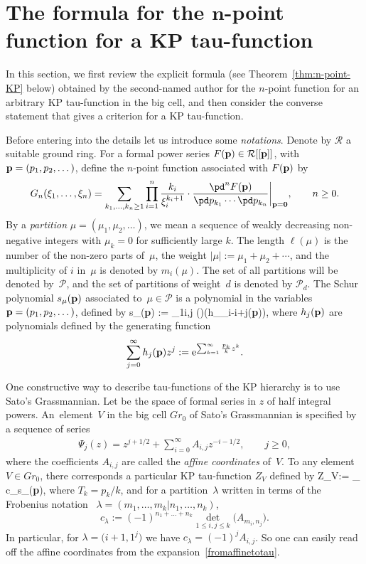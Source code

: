 \section[The formula for the n-point function for a KP tau-function]{The formula for the $\boldsymbol{n}$-point function for a KP tau-function}\label{sectionKP}

In this section, we first review the explicit formula (see Theorem~\ref{thm:n-point-KP} below) obtained by the second-named author
for the $n$-point function for an arbitrary KP tau-function in the big cell, and then consider the converse statement that
gives a criterion for a KP tau-function.

Before entering into the details let us introduce some {\it notations}.
Denote by $\mathcal{R}$ a suitable ground ring.
For a formal power series $F({\bf p})\in \mathcal{R}[[{\bf p}]]$,
with ${\bf p}=(p_1,p_2,\dots)$, define the $n$-point function associated with $F({\bf p})$ by
\[
G_n(\xi_1, \dots, \xi_n) = \sum_{k_1,\dots,k_n\ge1} \prod_{i=1}^n \frac{k_i}{\xi_i^{k_i+1}} \cdot
\frac{\pd^n F({\bf p})}{\pd p_{k_1} \cdots \pd p_{k_n}}\biggr|_{{\bf p} = {\bf 0}}, \qquad n\ge0.
\]
By a {\it partition} $\mu=(\mu_1,\mu_2,\dots)$, we mean a sequence of
weakly decreasing non-negative integers with $\mu_k=0$
 for sufficiently large $k$.
 The length $\ell(\mu)$ is the number of the non-zero parts of~$\mu$, the weight $|\mu|:=\mu_1+\mu_2+\cdots$,
 and the multiplicity of $i$ in~$\mu$ is denoted by $m_i(\mu)$.
 The set of all partitions will be denoted by~$\mathcal{P}$, and the set of partitions of weight~$d$ is denoted by $\mathcal{P}_d$.
 The
Schur polynomial $s_{\mu}({\bf p})$ associated to~$\mu\in\mathcal{P}$ is a polynomial in the variables
${\bf p} = (p_1,p_2,\dots)$,
defined by
\beq\label{defSchur1}
s_{\mu}({\bf p}) := \det_{1\leq i,j \leq \ell(\mu)}(h_{\mu_i-i+j}({\bf p})),
\eeq
where $h_j({\bf p})$ are polynomials defined by the generating function
\[
\sum_{j=0}^{\infty}h_j({\bf p})z^j := {\rm e}^{\sum_{k=1}^{\infty} \frac{p_k}{k} z^k}.
\]

One constructive way to describe tau-functions of the KP hierarchy is
to use Sato's Grassmannian. Let
 be the space of formal series in $z$ of half integral powers.
An~element~$V$ in the big cell $Gr_0$ of Sato's Grassmannian is specified by a sequence of series
\begin{gather*} %
\Psi_j(z) = z^{j+1/2} + \sum_{i=0}^\infty A_{i,j} z^{-i-1/2}, \qquad j \geq 0,
\end{gather*}
where the coefficients $A_{i,j}$ are called the {\em affine coordinates} of~$V$. To any element~$V\in Gr_0$, there corresponds
a particular KP tau-function $Z_V$ defined by
\beq\label{fromaffinetotau}
Z_V:= \sum_{\lambda\in{}} c_\lambda s_\lambda({\bf p}),
\eeq
where $T_k=p_k/k$, and for a partition~$\lambda$ written in terms of the Frobenius notation~\cite[Section~I.1, p.~3]{Mac}
$\lambda=(m_1,\dots,m_k|n_1,\dots,n_k)$,
\[
c_\lambda := (-1)^{n_1+\dots+n_k} \det_{1\leq i,j\leq k} \bigl(A_{m_i, n_j}\bigr).
\]
In particular, for $\lambda=\bigl(i+1,1^j\bigr)$ we have $c_\lambda=(-1)^j A_{i,j}$.
So one can easily read off the affine coordinates from the expansion~\eqref{fromaffinetotau}.

